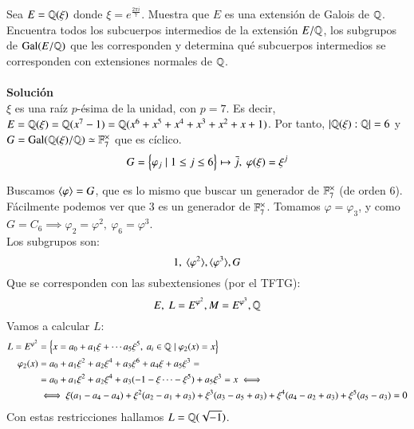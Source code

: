 \begin{ex}[H4.8]
    Sea $E = \mathbb{Q}(\xi)$ donde $\xi = e^{\frac{2 \pi i}{7}}$. Muestra que $E$ es una extensión de Galois de $\mathbb{Q}$. Encuentra todos los subcuerpos intermedios de la extensión $E/\mathbb{Q}$, los subgrupos de $\mathrm{Gal}(E/\mathbb{Q})$ que les corresponden y determina qué subcuerpos intermedios se corresponden con extensiones normales de $\mathbb{Q}$.\\\\

    \textbf{Solución}\\
    $\xi$ es una raíz $p$-ésima de la unidad, con $p=7$. Es decir, $E = \mathbb{Q}(\xi) = \mathbb{Q}(x^7-1) = \mathbb{Q}(x^6 + x^5 + x^4 + x^3 + x^2 + x + 1)$. Por tanto, $\left|\mathbb{Q}(\xi):\mathbb{Q}\right| = 6$ y $G = \mathrm{Gal}(\mathbb{Q}(\xi)/\mathbb{Q}) \simeq \mathbb{F}_7^\times$ que es cíclico.\\
    $$G = \left\{\varphi_j \mid 1 \leq j \leq 6\right\} \mapsto \bar{j},\ \varphi(\xi) = \xi^j$$

    Buscamos $\langle\varphi\rangle = G$, que es lo mismo que buscar un generador de $\mathbb{F}_7^\times$ (de orden $6$). Fácilmente podemos ver que $3$ es un generador de $\mathbb{F}_7^\times$. Tomamos $\varphi = \varphi_3$, y como $G = C_6 \implies \varphi_2 = \varphi^2,\ \varphi_6 = \varphi^3$.\\
    Los subgrupos son:
    $$
        1,\ \langle\varphi^2\rangle, \langle\varphi^3\rangle, G
    $$
    Que se corresponden con las subextensiones (por el TFTG):
    $$
        E,\ L=E^{\varphi^2}, M=E^{\varphi^3}, \mathbb{Q}
    $$
    Vamos a calcular $L$:
    \begin{align*}
        L=E^{\varphi^2} &= \left\{x = a_0 + a_1 \xi + \cdots a_5 \xi^5,\ a_i \in \mathbb{Q} \mid \varphi_2(x) = x\right\}\\
        \varphi_2(x)    &= a_0 + a_1\xi^2 + a_2\xi^4 + a_3\xi^6 + a_4\xi + a_5\xi^3 =\\
                        &= a_0 + a_1\xi^2 + a_2\xi^4 + a_3(-1 -\xi \cdots -\xi^5) + a_5\xi^3 = x \iff \\
                        &\iff \xi(a_1-a_4-a_4) + \xi^2(a_2-a_1+a_3) + \xi^3(a_3-a_5+a_3) + \xi^4(a_4-a_2+a_3) + \xi^5(a_5-a_3) = 0
    \end{align*}
    Con estas restricciones hallamos $L =\mathbb{Q}(\sqrt{-1})$.
\end{ex}
